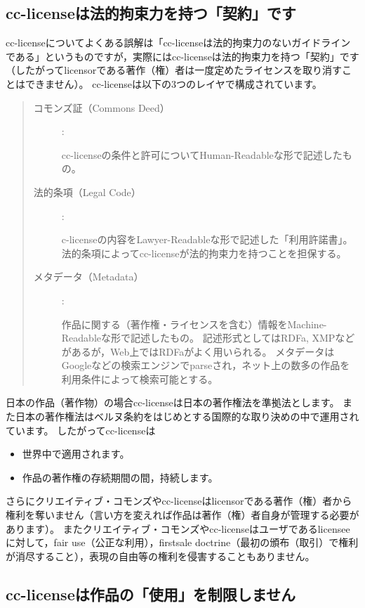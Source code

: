 \documentclass{ltjsarticle}
\begin{document}
\subsection{cc-licenseは法的拘束力を持つ「契約」です}

cc-licenseについてよくある誤解は「cc-licenseは法的拘束力のないガイドラインである」というものですが，実際にはcc-licenseは法的拘束力を持つ「契約」です（したがってlicensorである著作（権）者は一度定めたライセンスを取り消すことはできません）。
cc-licenseは以下の3つのレイヤで構成されています。
\begin{quote}\begin{description}
\item[コモンズ証（Commons Deed）] :\par
    cc-licenseの条件と許可についてHuman-Readableな形で記述したもの。
\item[法的条項（Legal Code）] :\par
    c-licenseの内容をLawyer-Readableな形で記述した「利用許諾書」。
    法的条項によってcc-licenseが法的拘束力を持つことを担保する。
\item[メタデータ（Metadata）] :\par
    作品に関する（著作権・ライセンスを含む）情報をMachine-Readableな形で記述したもの。
    記述形式としてはRDFa, XMPなどがあるが，Web上ではRDFaがよく用いられる。
    メタデータはGoogleなどの検索エンジンでparseされ，ネット上の数多の作品を利用条件によって検索可能とする。
\end{description}\end{quote}

日本の作品（著作物）の場合cc-licenseは日本の著作権法を準拠法とします。
また日本の著作権法はベルヌ条約をはじめとする国際的な取り決めの中で運用されています。
したがってcc-licenseは
\begin{itemize}
\item 世界中で適用されます。
\item 作品の著作権の存続期間の間，持続します。
\end{itemize}
さらにクリエイティブ・コモンズやcc-licenseはlicensorである著作（権）者から権利を奪いません（言い方を変えれば作品は著作（権）者自身が管理する必要があります）。
またクリエイティブ・コモンズやcc-licenseはユーザであるlicenseeに対して，fair use（公正な利用），firstsale doctrine（最初の頒布（取引）で権利が消尽すること），表現の自由等の権利を侵害することもありません。


\subsection{cc-licenseは作品の「使用」を制限しません} \label{sec:fair use}
\end{document}
